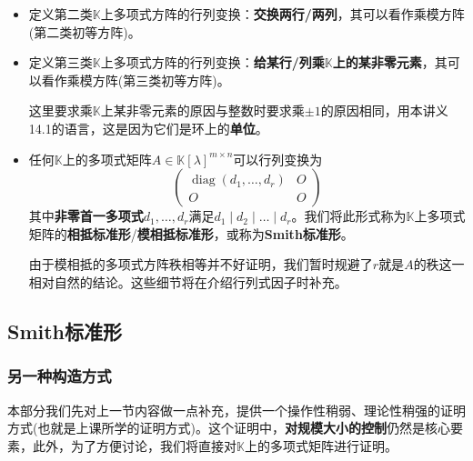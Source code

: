\documentclass[a4paper,UTF8,fontset=windows,AutoFakeBold]{ctexart}
\DeclareMathOperator{\diag}{diag}
\newcommand*{\note}{\noindent *}
\begin{document}
\begin{itemize}
    \item 定义第二类$\mathbb{K}$上多项式方阵的行列变换：\textbf{交换两行/两列}，其可以看作乘模方阵(第二类初等方阵)。
    
    \item 定义第三类$\mathbb{K}$上多项式方阵的行列变换：\textbf{给某行/列乘$\mathbb{K}$上的某非零元素}，其可以看作乘模方阵(第三类初等方阵)。
    
    \note 这里要求乘$\mathbb{K}$上某非零元素的原因与整数时要求乘$\pm1$的原因相同，用本讲义14.1的语言，这是因为它们是环上的\textbf{单位}。

    \item 任何$\mathbb{K}$上的多项式矩阵$A\in\mathbb{K}[\lambda]^{m\times n}$可以行列变换为
    $$\begin{pmatrix}\diag(d_1,\dots,d_r)&O\\O&O\end{pmatrix}$$
    其中\textbf{非零首一多项式}$d_1,\dots,d_r$满足$d_1\mid d_2\mid\dots\mid d_r$。我们将此形式称为$\mathbb{K}$上多项式矩阵的\textbf{相抵标准形}/\textbf{模相抵标准形}，或称为\textbf{Smith标准形}。

    \note 由于模相抵的多项式方阵秩相等并不好证明，我们暂时规避了$r$就是$A$的秩这一相对自然的结论。这些细节将在介绍行列式因子时补充。
\end{itemize}

\subsection{Smith标准形}
\subsubsection{另一种构造方式}
本部分我们先对上一节内容做一点补充，提供一个操作性稍弱、理论性稍强的证明方式(也就是上课所学的证明方式)。这个证明中，\textbf{对规模大小的控制}仍然是核心要素，此外，为了方便讨论，我们将直接对$\mathbb{K}$上的多项式矩阵进行证明。
\end{document}
